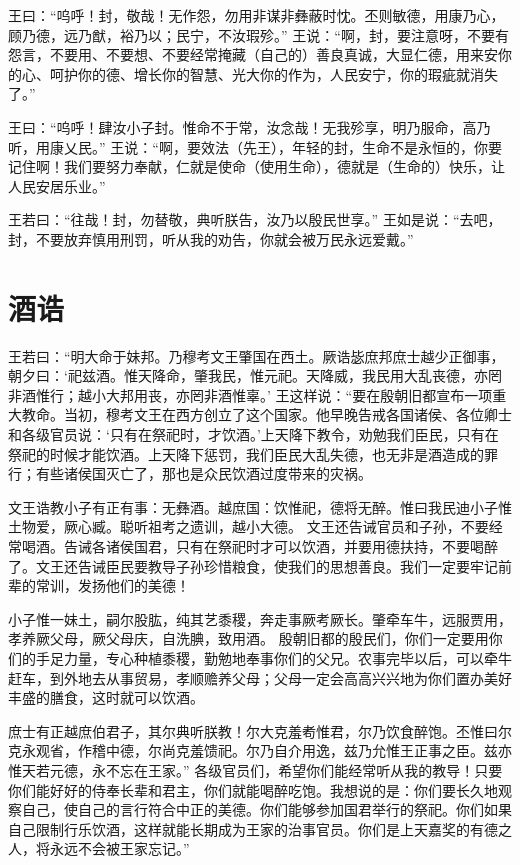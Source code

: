 \documentclass[12pt,UTF8]{ctexbook}
\begin{document}
王曰：“呜呼！封，敬哉！无作怨，勿用非谋非彝蔽时忱。丕则敏德，用康乃心，顾乃德，远乃猷，裕乃以；民宁，不汝瑕殄。”
王说：“啊，封，要注意呀，不要有怨言，不要用、不要想、不要经常掩藏（自己的）善良真诚，大显仁德，用来安你的心、呵护你的德、增长你的智慧、光大你的作为，人民安宁，你的瑕疵就消失了。”

王曰：“呜呼！肆汝小子封。惟命不于常，汝念哉！无我殄享，明乃服命，高乃听，用康乂民。”
王说：“啊，要效法（先王），年轻的封，生命不是永恒的，你要记住啊！我们要努力奉献，仁就是使命（使用生命），德就是（生命的）快乐，让人民安居乐业。”

王若曰：“往哉！封，勿替敬，典听朕告，汝乃以殷民世享。”
王如是说：“去吧，封，不要放弃慎用刑罚，听从我的劝告，你就会被万民永远爱戴。”

\chapter{酒诰}

王若曰：“明大命于妹邦。乃穆考文王肇国在西土。厥诰毖庶邦庶士越少正御事，朝夕曰：‘祀兹酒。惟天降命，肇我民，惟元祀。天降威，我民用大乱丧德，亦罔非酒惟行；越小大邦用丧，亦罔非酒惟辜。’
王这样说：“要在殷朝旧都宣布一项重大教命。当初，穆考文王在西方创立了这个国家。他早晚告戒各国诸侯、各位卿士和各级官员说：‘只有在祭祀时，才饮酒。’上天降下教令，劝勉我们臣民，只有在祭祀的时候才能饮酒。上天降下惩罚，我们臣民大乱失德，也无非是酒造成的罪行；有些诸侯国灭亡了，那也是众民饮酒过度带来的灾祸。

文王诰教小子有正有事：无彝酒。越庶国：饮惟祀，德将无醉。惟曰我民迪小子惟土物爱，厥心臧。聪听祖考之遗训，越小大德。
文王还告诫官员和子孙，不要经常喝酒。告诫各诸侯国君，只有在祭祀时才可以饮酒，并要用德扶持，不要喝醉了。文王还告诫臣民要教导子孙珍惜粮食，使我们的思想善良。我们一定要牢记前辈的常训，发扬他们的美德！

小子惟一妹土，嗣尔股肱，纯其艺黍稷，奔走事厥考厥长。肇牵车牛，远服贾用，孝养厥父母，厥父母庆，自洗腆，致用酒。
殷朝旧都的殷民们，你们一定要用你们的手足力量，专心种植黍稷，勤勉地奉事你们的父兄。农事完毕以后，可以牵牛赶车，到外地去从事贸易，孝顺赡养父母；父母一定会高高兴兴地为你们置办美好丰盛的膳食，这时就可以饮酒。

庶士有正越庶伯君子，其尔典听朕教！尔大克羞耇惟君，尔乃饮食醉饱。丕惟曰尔克永观省，作稽中德，尔尚克羞馈祀。尔乃自介用逸，兹乃允惟王正事之臣。兹亦惟天若元德，永不忘在王家。”
各级官员们，希望你们能经常听从我的教导！只要你们能好好的侍奉长辈和君主，你们就能喝醉吃饱。我想说的是：你们要长久地观察自己，使自己的言行符合中正的美德。你们能够参加国君举行的祭祀。你们如果自己限制行乐饮酒，这样就能长期成为王家的治事官员。你们是上天嘉奖的有德之人，将永远不会被王家忘记。”
\end{document}
